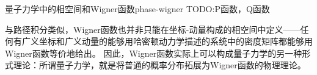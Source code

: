 \begin{back}{量子力学中的相空间和Wigner函数}{phase-wigner}
    TODO:P函数，Q函数

    与路径积分类似，Wigner函数也并非只能在坐标-动量构成的相空间中定义——任何有广义坐标和广义动量的能够用哈密顿动力学描述的系统中的密度矩阵都能够用Wigner函数等价地给出。
    因此，Wigner函数实际上可以构成量子力学的另一种形式理论：所谓量子力学，就是将普通的概率分布拓展为Wigner函数的物理理论。
\end{back}